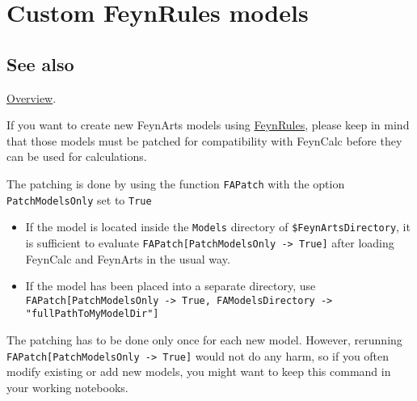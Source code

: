 \documentclass[../FeynCalcManual.tex]{subfiles}
\begin{document}
\hypertarget{custom feynrules models}{
\section{Custom FeynRules models}\label{custom feynrules models}}

\subsection{See also}

\hyperlink{toc}{Overview}.

If you want to create new FeynArts models using
\href{https://feynrules.irmp.ucl.ac.be/}{FeynRules}, please keep in mind
that those models must be patched for compatibility with FeynCalc before
they can be used for calculations.

The patching is done by using the function \texttt{FAPatch} with the
option \texttt{PatchModelsOnly} set to \texttt{True}

\begin{itemize}
\tightlist
\item
  If the model is located inside the \texttt{Models} directory of
  \texttt{\$FeynArtsDirectory}, it is sufficient to evaluate
  \texttt{FAPatch[\allowbreak{}PatchModelsOnly -> True]} after loading
  FeynCalc and FeynArts in the usual way.
\item
  If the model has been placed into a separate directory, use
  \texttt{FAPatch[\allowbreak{}PatchModelsOnly -> True,\ \allowbreak{}FAModelsDirectory -> "fullPathToMyModelDir"]}
\end{itemize}

The patching has to be done only once for each new model. However,
rerunning \texttt{FAPatch[\allowbreak{}PatchModelsOnly -> True]} would
not do any harm, so if you often modify existing or add new models, you
might want to keep this command in your working notebooks.
\end{document}
